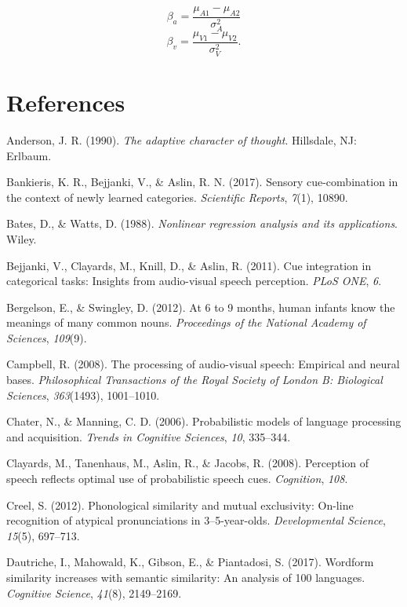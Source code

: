 \documentclass[english,,man,floatsintext]{apa6}
\theoremstyle{definition}
\theoremstyle{definition}
\theoremstyle{definition}
\theoremstyle{remark}
\begin{document}
\[\beta_a=\frac{\mu_{A1}-\mu_{A2}}{\sigma^2_{A}}\]
\[\beta_v=\frac{\mu_{V1}-\mu_{V2}}{\sigma^2_{V}}.\]

\section{References}\label{references}

\setlength{\parindent}{-0.5in} \setlength{\leftskip}{0.5in}

\hypertarget{refs}{}
\hypertarget{ref-anderson90}{}
Anderson, J. R. (1990). \emph{The adaptive character of thought}.
Hillsdale, NJ: Erlbaum.

\hypertarget{ref-Bankieris17}{}
Bankieris, K. R., Bejjanki, V., \& Aslin, R. N. (2017). Sensory
cue-combination in the context of newly learned categories.
\emph{Scientific Reports}, \emph{7}(1), 10890.

\hypertarget{ref-bates88}{}
Bates, D., \& Watts, D. (1988). \emph{Nonlinear regression analysis and
its applications}. Wiley.

\hypertarget{ref-bejjanki2011}{}
Bejjanki, V., Clayards, M., Knill, D., \& Aslin, R. (2011). Cue
integration in categorical tasks: Insights from audio-visual speech
perception. \emph{PLoS ONE}, \emph{6}.

\hypertarget{ref-bergelson2012}{}
Bergelson, E., \& Swingley, D. (2012). At 6 to 9 months, human infants
know the meanings of many common nouns. \emph{Proceedings of the
National Academy of Sciences}, \emph{109}(9).

\hypertarget{ref-Campbell2008}{}
Campbell, R. (2008). The processing of audio-visual speech: Empirical
and neural bases. \emph{Philosophical Transactions of the Royal Society
of London B: Biological Sciences}, \emph{363}(1493), 1001--1010.

\hypertarget{ref-chater06}{}
Chater, N., \& Manning, C. D. (2006). Probabilistic models of language
processing and acquisition. \emph{Trends in Cognitive Sciences},
\emph{10}, 335--344.

\hypertarget{ref-clayard08}{}
Clayards, M., Tanenhaus, M., Aslin, R., \& Jacobs, R. (2008). Perception
of speech reflects optimal use of probabilistic speech cues.
\emph{Cognition}, \emph{108}.

\hypertarget{ref-Creel2012}{}
Creel, S. (2012). Phonological similarity and mutual exclusivity:
On-line recognition of atypical pronunciations in 3--5-year-olds.
\emph{Developmental Science}, \emph{15}(5), 697--713.

\hypertarget{ref-dautriche17}{}
Dautriche, I., Mahowald, K., Gibson, E., \& Piantadosi, S. (2017).
Wordform similarity increases with semantic similarity: An analysis of
100 languages. \emph{Cognitive Science}, \emph{41}(8), 2149--2169.
\end{document}
